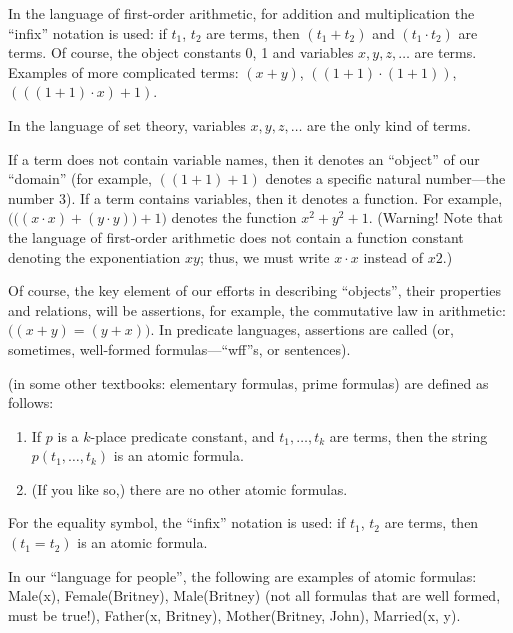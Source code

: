 \begin{ex}[]
In the language of first-order arithmetic, for addition and multiplication the ``infix'' notation is used: if \(t_1\), \(t_2\) are terms, then \((t_1+t_2)\) and \((t_1\cdot t_2)\) are terms.
Of course, the object constants 0, 1 and variables \(x, y, z, \ldots\) are terms.
Examples of more complicated terms: \((x+y)\), \(((1+1)\cdot (1+1))\), \((((1+1)\cdot x)+1)\).
\end{ex}

\begin{ex}[]
In the language of set theory, variables \(x, y, z, \ldots\)  are the only kind of terms.
\end{ex}

If a term does not contain variable names, then it denotes an ``object'' of our ``domain'' (for example, \(((1+1)+1)\) denotes a specific natural number---the number 3).
If a term contains variables, then it denotes a function.
For example, \(\Big(\big((x\cdot x)+(y\cdot y)\big)+1\Big)\) denotes the function \(x^2+y^2+1.\)
(Warning! Note that the language of first-order arithmetic does not contain a function constant denoting the exponentiation \(xy\); thus, we must write \(x\cdot x\) instead of \(x2\).)

Of course, the key element of our efforts in describing ``objects'', their properties and relations, will be assertions, for example, the commutative law in arithmetic: \(\big((x+y)=(y+x)\big)\).
In predicate languages, assertions are called  (or, sometimes, well-formed formulas---``wff''s, or sentences).

 (in some other textbooks: elementary formulas, prime formulas) are defined as follows:

\begin{enumerate}
    \item If \(p\) is a \(k\)-place predicate constant, and \(t_1, \ldots , t_k\) are terms, then the string \(p(t_1, \ldots , t_k)\) is an atomic formula.
    \item (If you like so,) there are no other atomic formulas.
\end{enumerate}
For the equality symbol, the ``infix'' notation is used: if \(t_1\), \(t_2\) are terms, then \((t_1=t_2)\) is an atomic formula.

\begin{ex}[]
In our ``language for people'', the following are examples of atomic formulas: Male(x), Female(Britney), Male(Britney) (not all formulas that are well formed, must be true!), Father(x, Britney), Mother(Britney, John), Married(x, y).
\end{ex}

